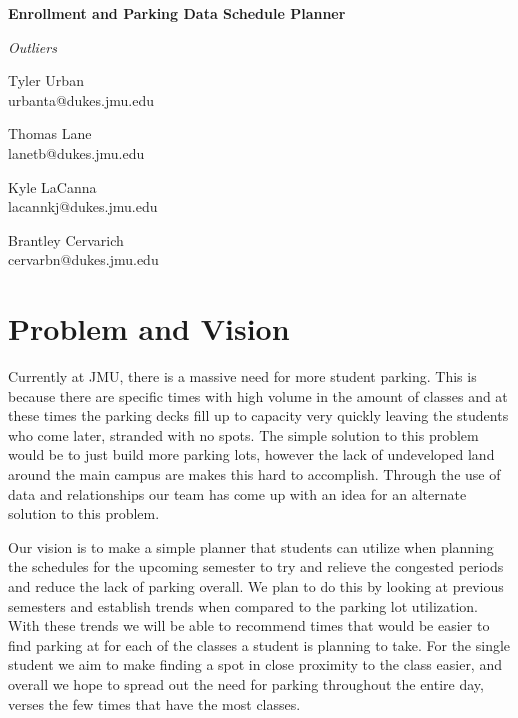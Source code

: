 \documentclass[11pt]{article}
\begin{document}

\begin{center}
\bfseries\huge
Enrollment and Parking Data Schedule Planner
\end{center}

\begin{center}
\itshape\large
Outliers
\end{center}

\begin{multicols}{4}
\centering

Tyler Urban \\
{\footnotesize urbanta@dukes.jmu.edu}

Thomas Lane \\
{\footnotesize lanetb@dukes.jmu.edu}

Kyle LaCanna \\
{\footnotesize lacannkj@dukes.jmu.edu}

Brantley Cervarich \\
{\footnotesize cervarbn@dukes.jmu.edu}

\end{multicols}

\section*{Problem and Vision}


\indent \indent Currently at JMU, there is a massive need for more student parking. This is because there are specific times with high volume in the amount of classes and at these times the parking decks fill up to capacity very quickly leaving the students who come later, stranded with no spots. The simple solution to this problem would be to just build more parking lots, however the lack of undeveloped land around the main campus are makes this hard to accomplish. Through the use of data and relationships our team has come up with an idea for an alternate solution to this problem.

\indent \indent Our vision is to make a simple planner that students can utilize when planning the schedules for the upcoming semester to try and relieve the congested periods and reduce the lack of parking overall. We plan to do this by looking at previous semesters and establish trends when compared to the parking lot utilization. With these trends we will be able to recommend times that would be easier to find parking at for each of the classes a student is planning to take. For the single student we aim to make finding a spot in close proximity to the class easier, and overall we hope to spread out the need for parking throughout the entire day, verses the few times that have the most classes.
\end{document}
